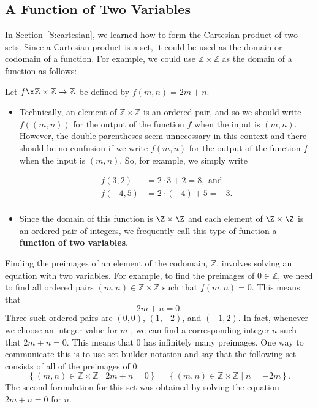 %

%
\subsection*{A Function of Two Variables} \label{ss:functiontwovar}
In Section~\ref{S:cartesian}, we learned how to form the Cartesian product of two sets.  Since a Cartesian product is a set, it could be used as the domain or codomain of a function.  For example, we could use  $\mathbb{Z} \times \mathbb{Z}$ as the domain of a function as follows:
%
\begin{center}
Let $f\x \mathbb{Z} \times \mathbb{Z} \to \mathbb{Z}$ be defined by  
$f( {m, n} ) = 2m + n$.
\end{center}

\begin{itemize}
\item Technically, an element of  $\mathbb{Z} \times \mathbb{Z}$  is an ordered pair, and so we should write  $f( {( {m, n} )} )$ for the output of the function  $f$   when the input is  
$\left( {m, n} \right)$.  However, the double parentheses seem unnecessary in this context and there should be no confusion if we write  $f( {m, n} )$ for the output of the function  $f$   when the input is  $\left( {m, n} \right)$.  So, for example, we simply write

\[
\begin{aligned}
  f( {3, 2} )    &= 2 \cdot 3 + 2 = 8,\text{ and} \\ 
  f( { - 4, 5} ) &= 2 \cdot \left( { - 4} \right) + 5 =  - 3. \\ 
\end{aligned} 
\]
\item Since the domain of this function is $\Z \times \Z$ and each element of $\Z \times \Z$ is an ordered pair of integers, we frequently call this type of function a \textbf{function of two variables}.
%
\end{itemize}

Finding the preimages of an element of the codomain, $\mathbb{Z}$, involves solving an equation with two variables.  For example, to find the preimages of  $0 \in \mathbb{Z}$, we need to find all ordered pairs  $\left( {m, n} \right) \in \mathbb{Z} \times \mathbb{Z}$ such that 
$f( {m, n} ) = 0$.  This means that
\[
2m + n = 0.
\]
Three such ordered pairs are  $\left( {0, 0} \right)$, $\left( {1,  - 2} \right)$, and  $\left( { - 1, 2} \right)$.  In fact, whenever we choose an integer value for  $m$ , we can find a corresponding integer  $n$  such that  $2m + n = 0$.  This means that  0  has infinitely many preimages.  One way to communicate this is to use set builder notation and say that the following set consists of all of the preimages of  0:
\[
\left\{ { {\left( {m, n} \right) \in \mathbb{Z} \times \mathbb{Z} } \mid 2m + n = 0} \right\} = \left\{ { {\left( {m, n} \right) \in \mathbb{Z} \times \mathbb{Z} } \mid n =  - 2m} \right\}\!.
\]
The second formulation for this set was obtained by solving the equation  
\linebreak $2m + n = 0$
for  $n$.

